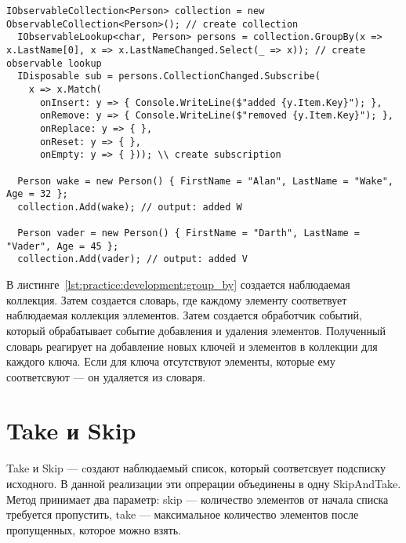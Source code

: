 \begin{lstlisting}[style=csharpinlinestyle, caption={Пример использования GroupBy}, label=lst:practice:development:group_by]
  IObservableCollection<Person> collection = new ObservableCollection<Person>(); // create collection
  IObservableLookup<char, Person> persons = collection.GroupBy(x => x.LastName[0], x => x.LastNameChanged.Select(_ => x)); // create observable lookup
  IDisposable sub = persons.CollectionChanged.Subscribe(
    x => x.Match(
      onInsert: y => { Console.WriteLine($"added {y.Item.Key}"); },
      onRemove: y => { Console.WriteLine($"removed {y.Item.Key}"); },
      onReplace: y => { },
      onReset: y => { },
      onEmpty: y => { })); \\ create subscription

  Person wake = new Person() { FirstName = "Alan", LastName = "Wake", Age = 32 };
  collection.Add(wake); // output: added W

  Person vader = new Person() { FirstName = "Darth", LastName = "Vader", Age = 45 };
  collection.Add(vader); // output: added V

\end{lstlisting}

В листинге~\ref{lst:practice:development:group_by} создается наблюдаемая коллекция. Затем создается словарь, где каждому элементу соответвует наблюдаемая коллекция эллементов.
Затем создается обработчик событий, который обрабатывает событие добавления и удаления элементов.
Полученный словарь реагирует на добавление новых ключей и элементов в коллекции для каждого ключа. Если для ключа отсутствуют элементы, которые ему соответсвуют --- он удаляется из словаря.

\section{Take и Skip}
\label{sub:development:take_skip}

Take и Skip --- cоздают наблюдаемый список, который соответсвует подсписку исходного. В данной реализации эти опрерации объединены в одну SkipAndTake.
Метод принимает два параметр: skip --- количество элементов от начала списка требуется пропустить, take --- максимальное количество элементов после пропущенных, которое можно взять.


